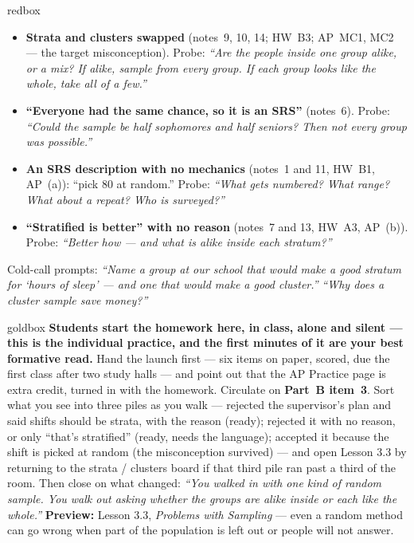 \documentclass[10pt]{article}
\begin{document}
\boxguard
\begin{skillbox}{redbox}
\begin{itemize}[leftmargin=1.2em, nosep]
  \item \textbf{Strata and clusters swapped} (notes~9, 10, 14; HW~B3; AP~MC1, MC2 --- the target
        misconception). Probe: \emph{``Are the people inside one group alike, or a mix? If
        alike, sample from every group. If each group looks like the whole, take all of a
        few.''}
  \item \textbf{``Everyone had the same chance, so it is an SRS''} (notes~6). Probe:
        \emph{``Could the sample be half sophomores and half seniors? Then not every group was
        possible.''}
  \item \textbf{An SRS description with no mechanics} (notes~1 and 11, HW~B1, AP~(a)): ``pick 80
        at random.'' Probe: \emph{``What gets numbered? What range? What about a repeat? Who is
        surveyed?''}
  \item \textbf{``Stratified is better'' with no reason} (notes~7 and 13, HW~A3, AP~(b)).
        Probe: \emph{``Better how --- and what is alike inside each stratum?''}
\end{itemize}
Cold-call prompts: \emph{``Name a group at our school that would make a good stratum for
`hours of sleep' --- and one that would make a good cluster.''} \quad \emph{``Why does a cluster
sample save money?''}
\end{skillbox}

\boxguard
\begin{skillbox}{goldbox}
\textbf{Students start the homework here, in class, alone and silent --- this is the individual
practice, and the first minutes of it are your best formative read.} Hand the launch first ---
six items on paper, scored, due the first class after two study halls --- and point out that
the AP Practice page is extra credit, turned in with the homework. Circulate on \textbf{Part~B
item~3}. Sort what you see into three piles as you walk --- rejected the supervisor's plan and
said shifts should be strata, with the reason (ready); rejected it with no reason, or only
``that's stratified'' (ready, needs the language); accepted it because the shift is picked at
random (the misconception survived) --- and open Lesson 3.3 by returning to the
strata / clusters board if that third pile ran past a third of the room. Then close on what
changed: \emph{``You walked in with one kind of random sample. You walk out asking whether the
groups are alike inside or each like the whole.''} \textbf{Preview:} Lesson 3.3, \emph{Problems
with Sampling} --- even a random method can go wrong when part of the population is left out
or people will not answer.
\end{skillbox}
\end{document}
